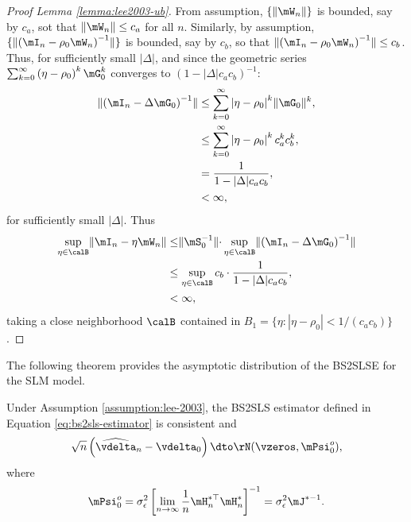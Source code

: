 \documentclass[english,12pt]{book}\usepackage[]{graphicx}\usepackage[]{xcolor}
\begin{document}
\begin{proof}[Proof Lemma \ref{lemma:lee2003-ub}]
From assumption, $\{\lVert \mW_n\rVert\}$ is bounded, say by $c_a$, sot that $\lVert \mW_n\rVert\leq c_a$ for all $n$. Similarly, by assumption, $\{\lVert \left(\mI_n - \rho_0\mW_n\right)^{-1}\rVert\}$ is bounded, say by $c_b$, so that $\lVert \left(\mI_n - \rho_0\mW_n\right)^{-1}\rVert\leq c_b$. Thus, for sufficiently small $|\Delta|$, and since the geometric series $\sum_{k = 0}^{\infty}\left(\eta-\rho_0\right)^k\mG_0^k$ converges to $(1 - |\Delta|c_ac_b)^{-1}$:
\begin{equation*}
\begin{aligned}
\lVert  \left(\mI_n - \Delta \mG_0\right)^{-1}\rVert & \leq \sum_{k = 0}^{\infty}\left|\eta-\rho_0\right|^k\rVert \mG_0\rVert^k, \\
&\leq \sum_{k = 0}^{\infty}\left|\eta-\rho_0\right|^k c_a^kc_b^k, \\
& = \frac{1}{1 - |\Delta|c_ac_b}, \\
& < \infty,
\end{aligned}
\end{equation*}
for sufficiently small $|\Delta|$. Thus
\begin{equation*}
\begin{aligned}
  \sup_{\eta \in \calB}\lVert \mI_n - \eta\mW_n \rVert & \leq \rVert \mS_0^{-1} \lVert \cdot \sup_{\eta \in \calB}\lVert  \left(\mI_n - \Delta \mG_0\right)^{-1}\rVert \\
  & \leq \sup_{\eta \in \calB} c_b \cdot \frac{1}{1 - |\Delta|c_ac_b}, \\
  & < \infty,
\end{aligned}  
\end{equation*}
%
taking a close neighborhood $\calB$ contained in $B_1 = \{\eta: |\eta - \rho_0|< 1/(c_ac_b)\}$.
\end{proof}

The following theorem provides the asymptotic distribution of the BS2SLSE for the SLM model. 

\begin{theorem}\label{teo:BS2SLS_est_slm}
Under Assumption \ref{assumption:lee-2003}, the BS2SLS estimator defined in Equation \eqref{eq:bs2sls-estimator} is consistent and
\begin{equation*}
  \sqrt{n}\left(\widehat{\vdelta}_n - \vdelta_0\right) \dto \rN(\vzeros, \mPsi_0^o), 
\end{equation*}
where
\begin{equation}\label{eq:limiting-var-b2sls}
\mPsi_0^o = \sigma_{\epsilon}^2\left[\lim_{n\to\infty} \frac{1}{n}\mH^{*\top}_n \mH_n^*\right]^{-1} = \sigma_{\epsilon}^2\mJ^{*-1}.
\end{equation}
\end{theorem}
\end{document}
